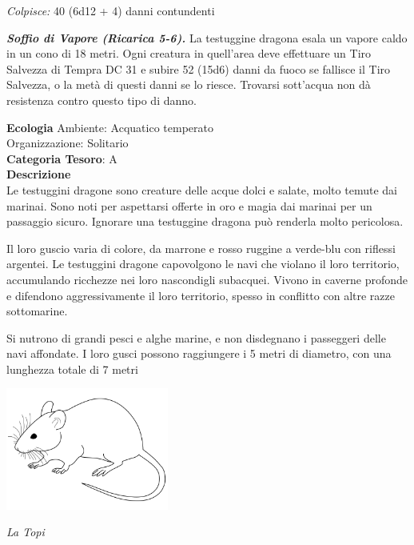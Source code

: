\begin{multicols}{2}
{\emph{Colpisce:} 40 (6d12 + 4) danni contundenti

\emph{\textbf{Soffio di Vapore (Ricarica 5-6).}} La testuggine dragona esala un vapore caldo in un cono di 18 metri. Ogni creatura in quell'area deve effettuare un Tiro Salvezza di Tempra DC 31 e subire 52 (15d6) danni da fuoco se fallisce il Tiro Salvezza, o la metà di questi danni se lo riesce. Trovarsi sott'acqua non dà resistenza contro questo tipo di danno.

\textbf{Ecologia}
Ambiente: Acquatico temperato\\
Organizzazione: Solitario\\
\textbf{Categoria Tesoro}: A\\
\textbf{Descrizione}\\
Le testuggini dragone sono creature delle acque dolci e salate, molto temute dai marinai. Sono noti per aspettarsi offerte in oro e magia dai marinai per un passaggio sicuro. Ignorare una testuggine dragona può renderla molto pericolosa.

Il loro guscio varia di colore, da marrone e rosso ruggine a verde-blu con riflessi argentei. Le testuggini dragone capovolgono le navi che violano il loro territorio, accumulando ricchezze nei loro nascondigli subacquei. Vivono in caverne profonde e difendono aggressivamente il loro territorio, spesso in conflitto con altre razze sottomarine.

Si nutrono di grandi pesci e alghe marine, e non disdegnano i passeggeri delle navi affondate. I loro gusci possono raggiungere i 5 metri di diametro, con una lunghezza totale di 7 metri


\medskip

\begin{center}
	\includegraphics[width=0.4\textwidth]{immagini/mice.png}

	\centering
	\emph{La Topi}
\end{center}

}
\end{multicols}
